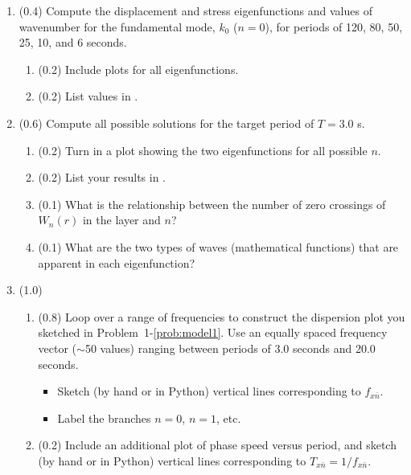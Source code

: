 \documentclass[11pt,titlepage,fleqn]{article}
\newcommand{\cutoff}[1]{{#1}_{x\bar{n}}}
\begin{document}
\begin{enumerate}

\item (0.4) Compute the displacement and stress eigenfunctions and values of wavenumber for the fundamental mode, $k_0$ ($n=0$), for periods of 120, 80, 50, 25, 10, and 6 seconds.

\begin{enumerate}
\item (0.2) Include plots for all eigenfunctions.
\item (0.2) List values in .
\end{enumerate}


\item (0.6) Compute all possible solutions for the target period of $T = 3.0$ s.
%
\begin{enumerate}
\item (0.2) Turn in a plot showing the two eigenfunctions for all possible $n$.

\item (0.2) List your results in .

\item (0.1) What is the relationship between the number of zero crossings of $W_n(r)$ in the layer and $n$?
\item (0.1) What are the two types of waves (\ie mathematical functions) that are apparent in each eigenfunction?
\end{enumerate}


\item (1.0)
\begin{enumerate}
\item (0.8) Loop over a range of frequencies to construct the dispersion plot you sketched in Problem~1-\ref{prob:model1}. Use an equally spaced frequency vector ($\sim$50 values) ranging between periods of 3.0 seconds and 20.0 seconds.
%
\begin{itemize}
\item Sketch (by hand or in Python) vertical lines corresponding to $\cutoff{f}$.
\item Label the branches $n=0$, $n=1$, etc.
\end{itemize}

\item (0.2) Include an additional plot of phase speed versus period, and sketch (by hand or in Python) vertical lines corresponding to $\cutoff{T} = 1/\cutoff{f}$.


\end{enumerate}
\end{enumerate}
\end{document}
